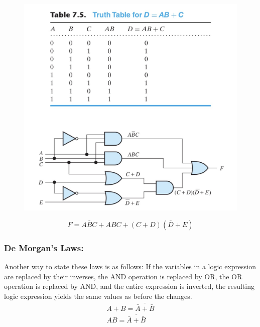 \documentclass[a4paper,12]{article}
\begin{document}
     \begin{figure}[H]
         \centering
         \includegraphics[width=120mm]{Image/38.jpg}
     \end{figure}
     \[F=A\bar{B}C+ABC+(C+D)(\bar{D}+E)\]
     \subsubsection{De Morgan's Laws:}
     Another way to state these laws is as follows: If the variables in a logic expression are replaced by their inverses, the AND operation is replaced by OR, the OR operation is replaced by AND, and the entire expression is inverted, the resulting logic expression yields the same values as before the changes.
     \begin{gather}
         A+B=\overline{\bar{A}+\bar{B}}\\
         AB=\overline{\bar{A}+\bar{B}}
     \end{gather}
\end{document}
